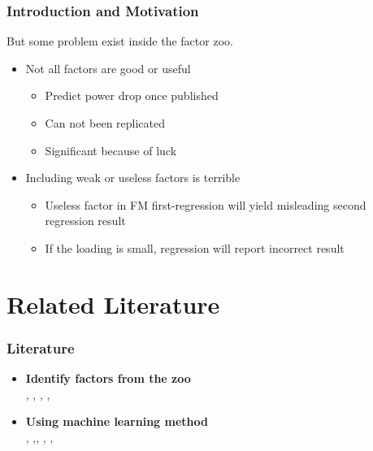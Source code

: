 \documentclass[12pt]{beamer}
\begin{document}
\begin{frame}
\frametitle{Introduction and Motivation}
But some problem exist inside the factor zoo.\\

\begin{itemize}
\item Not all factors are good or useful
\begin{itemize}
\item Predict power drop once published \cite{McLean2016}
\item Can not been replicated \cite{Hou2018}
\item Significant because of luck \cite{Harvey2014}
\end{itemize}
\item Including weak or useless factors is terrible
\begin{itemize}
\item Useless factor in FM first-regression\cite{Fama1973} will yield misleading second regression result \cite{Kan1999}
\item If the loading is small, regression will report incorrect result 
\end{itemize}
\end{itemize}
\end{frame}


	\section{Related Literature}
	\begin{frame}
\frametitle{Literature}
\begin{itemize}
	\item {\bf Identify factors from the zoo}\\
	, , , ,
	\item {\bf Using machine learning method}\\
	, ,, , , 
	\end{itemize}
	\end{frame}
	
\end{document}
